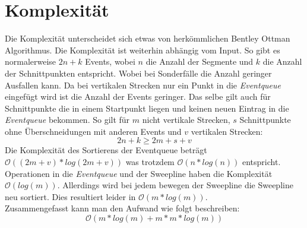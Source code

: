 \documentclass[conference]{IEEEtran}
\begin{document}
	\section{Komplexität}
	Die Komplexität unterscheidet sich etwas von herkömmlichen Bentley Ottman Algorithmus. Die Komplexität ist weiterhin abhängig vom Input. So gibt es normalerweise $2n + k$ Events, wobei $n$ die Anzahl der Segmente und $k$ die Anzahl der Schnittpunkten entspricht. Wobei bei Sonderfälle die Anzahl geringer Ausfallen kann. Da bei vertikalen Strecken nur ein Punkt in die \textit{Eventqueue} eingefügt wird ist die Anzahl der Events geringer. Das selbe gilt auch für Schnittpunkte die in einem Startpunkt liegen und keinen neuen Eintrag in die \textit{Eventqueue} bekommen. So gilt für $m$ nicht vertikale Strecken, $s$ Schnittpunkte ohne Überschneidungen mit anderen Events und $v$ vertikalen Strecken:
	\[ 2n + k \geq 2m + s + v \]
	Die Komplexität des Sortierens der Eventqueue beträgt $\mathcal{O}((2m+v)*log(2m+v))$ was trotzdem $\mathcal{O}(n*log(n))$ entspricht.\\
	Operationen in die \textit{Eventqueue} und der Sweepline haben die Komplexität $\mathcal{O}(log(m))$. Allerdings wird bei jedem bewegen der Sweepline die Sweepline neu sortiert. Dies resultiert leider in $\mathcal{O}(m*log(m))$.\\
	Zusammengefasst kann man den Aufwand wie folgt beschreiben:
	\[\mathcal{O}(m*log(m) + m*m*log(m)) \]
	
\end{document}
